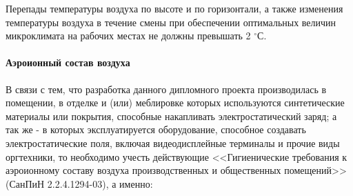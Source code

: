 Перепады температуры воздуха по высоте и по горизонтали, а также изменения температуры воздуха в течение смены при обеспечении оптимальных величин микроклимата на рабочих местах не должны превышать 2 $^{\circ}С$.

\paragraph{Аэроионный состав воздуха}

В связи с тем, что разработка данного дипломного проекта производилась в помещении, в отделке и (или) меблировке которых используются синтетические материалы или покрытия, способные накапливать электростатический заряд; а так же - в которых эксплуатируется оборудование, способное создавать электростатические поля, включая видеодисплейные терминалы и прочие виды оргтехники, то необходимо учесть действующие <<Гигиенические требования к аэроионному составу воздуха производственных и общественных помещений>> (СанПиН 2.2.4.1294-03), а именно:

